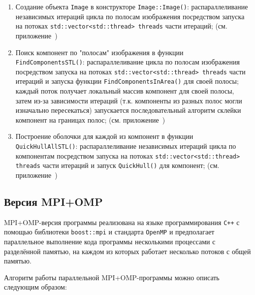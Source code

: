 \documentclass[12pt]{article}
\begin{document}
\begin{enumerate}
    \item Создание объекта \texttt{Image} в конструкторе \texttt{Image::Image()}: распараллеливание независимых итераций цикла по полосам изображения посредством запуска на потоках \texttt{std::vector<std::thread> threads} части итераций; (см. приложение~)
    \item Поиск компонент по "полосам" изображения в функции \texttt{FindComponentsSTL()}: распараллеливание цикла по полосам изображения посредством запуска на потоках \texttt{std::vector<std::thread> threads} части итераций и запуска функции \texttt{FindComponentsInArea()} для своей полосы; каждый поток получает локальный массив компонент для своей полосы, затем из-за зависимости итераций (т.к. компоненты из разных полос могли изначально пересекаться) запускается последовательный алгоритм склейки компонент на границах полос; (см. приложение~)
    \item Построение оболочки для каждой из компонент в функции \texttt{QuickHullAllSTL()}: распараллеливание независимых итераций цикла по компонентам посредством запуска на потоках \texttt{std::vector<std::thread> threads} части итераций и запуск \texttt{QuickHull()} для компонент; (см. приложение~)
\end{enumerate}

\newpage

\subsection{Версия MPI+OMP}

MPI+OMP-версия программы реализована на языке программирования \texttt{C++} с помощью библиотеки \texttt{boost::mpi} и стандарта \texttt{OpenMP} и предполагает параллельное выполнение кода программы несколькими процессами с разделённой памятью, на каждом из которых работает несколько потоков с общей памятью.

Алгоритм работы параллельной MPI+OMP-программы можно описать следующим образом:
\end{document}
